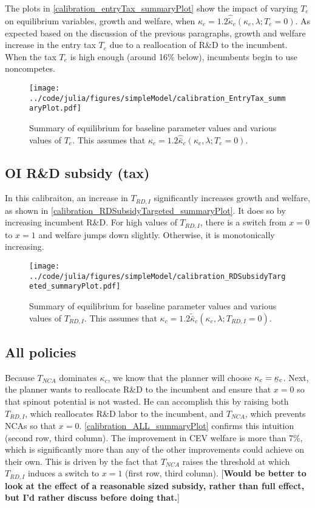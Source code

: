\documentclass[11pt,english]{article}
\newcommand\munderbar[1]{%
	\underaccent{\bar}{#1}}
\begin{document}
The plots in \autoref{calibration_entryTax_summaryPlot} show the impact of varying $T_e$ on equilibrium variables, growth and welfare, when $\kappa_c = 1.2 \hat{\tilde{\kappa}}_c(\kappa_e,\lambda;T_e = 0)$. As expected based on the discussion of the previous paragraphs, growth and welfare increase in the entry tax $T_e$ due to a reallocation of R\&D to the incumbent. When the tax $T_e$ is high enough (around 16\% below), incumbents begin to use noncompetes.  

\begin{figure}[]
	\texttt{[image: ../code/julia/figures/simpleModel/calibration\_EntryTax\_summaryPlot.pdf]}
	\caption{Summary of equilibrium for baseline parameter values and various values of $T_e$. This assumes that $\kappa_c = 1.2 \hat{\bar{\kappa}}_c(\kappa_e,\lambda;T_e = 0)$.}
	\label{calibration_entryTax_summaryPlot}
\end{figure}

\subsection{OI R\&D subsidy (tax)}\label{cs:oi_rd_subsidy}

In this calibraiton, an increase in $T_{RD,I}$ significantly increases growth and welfare, as shown in \autoref{calibration_RDSubsidyTargeted_summaryPlot}. It does so by increasing incumbent R\&D. For high values of $T_{RD,I}$, there is a switch from $x = 0$ to $x = 1$ and welfare jumps down slightly. Otherwise, it is monotonically increasing. 

\begin{figure}[]
	\texttt{[image: ../code/julia/figures/simpleModel/calibration\_RDSubsidyTargeted\_summaryPlot.pdf]}
	\caption{Summary of equilibrium for baseline parameter values and various values of $T_{RD,I}$. This assumes that $\kappa_c = 1.2 \tilde{\bar{\kappa}}_c(\kappa_e,\lambda;T_{RD,I} = 0)$.}
	\label{calibration_RDSubsidyTargeted_summaryPlot}
\end{figure}


\subsection{All policies}

Because $T_{NCA}$ dominates $\kappa_c$, we know that the planner will choose $\kappa_c = \munderbar{\kappa}_c$. Next, the planner wants to reallocate R\&D to the incumbent and ensure that $x = 0$ so that spinout potential is not wasted. He can accomplish this by raising both $T_{RD,I}$, which reallocates R\&D labor to the incumbent, and $T_{NCA}$, which prevents NCAs so that $x = 0$. \autoref{calibration_ALL_summaryPlot} confirms this intuition (second row, third column). The improvement in CEV welfare is more than 7\%, which is significantly more than any of the other improvements could achieve on their own. This is driven by the fact that $T_{NCA}$ raises the threshold at which $T_{RD,I}$ induces a switch to $x = 1$ (first row, third column). [\textbf{Would be better to look at the effect of a reasonable sized subsidy, rather than full effect, but I'd rather discuss before doing that.}] 
\end{document}
